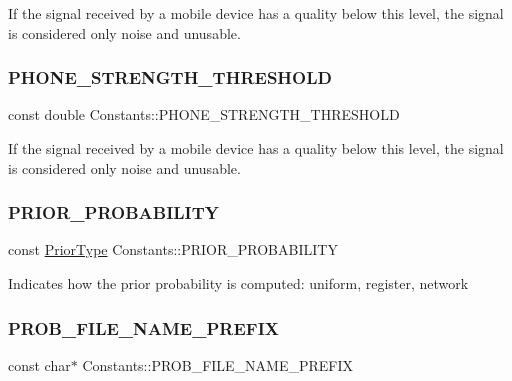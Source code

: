 If the signal received by a mobile device has a quality below this level, the signal is considered only noise and unusable. \mbox{\label{class_constants_a24b6069c3365fb95c4b853129e4d4a3e}} 
\subsubsection{\texorpdfstring{PHONE\_STRENGTH\_THRESHOLD}{PHONE\_STRENGTH\_THRESHOLD}}
{\footnotesize\ttfamily const double Constants\+::\+P\+H\+O\+N\+E\+\_\+\+S\+T\+R\+E\+N\+G\+T\+H\+\_\+\+T\+H\+R\+E\+S\+H\+O\+LD\hspace{0.3cm}{\ttfamily [static]}}

If the signal received by a mobile device has a quality below this level, the signal is considered only noise and unusable. \mbox{\label{class_constants_a7b31976adc7ad0f3dbed86b205e1773d}} 
\subsubsection{\texorpdfstring{PRIOR\_PROBABILITY}{PRIOR\_PROBABILITY}}
{\footnotesize\ttfamily const \mbox{\hyperlink{_prior_type_8h_a61286c562e68de246982fc393a7c23a5}{Prior\+Type}} Constants\+::\+P\+R\+I\+O\+R\+\_\+\+P\+R\+O\+B\+A\+B\+I\+L\+I\+TY\hspace{0.3cm}{\ttfamily [static]}}

Indicates how the prior probability is computed\+: uniform, register, network \mbox{\label{class_constants_a3b2d3fc0ccc4636a51190bf5b297d72d}} 
\subsubsection{\texorpdfstring{PROB\_FILE\_NAME\_PREFIX}{PROB\_FILE\_NAME\_PREFIX}}
{\footnotesize\ttfamily const char$\ast$ Constants\+::\+P\+R\+O\+B\+\_\+\+F\+I\+L\+E\+\_\+\+N\+A\+M\+E\+\_\+\+P\+R\+E\+F\+IX\hspace{0.3cm}{\ttfamily [static]}}

